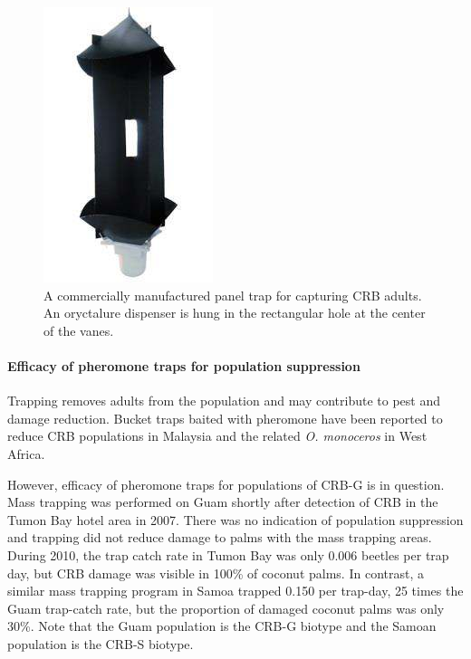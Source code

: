 \documentclass[twocolumn,letterpaper]{scrartcl}
\begin{document}
\begin{figure}[h]
	\centering
	\includegraphics[width=0.7\linewidth]{images/panel-trap}
	\caption{A commercially manufactured panel trap for capturing CRB adults. An oryctalure dispenser is hung in the rectangular hole at the center of the vanes.}
	\label{fig:panel-trap}
\end{figure}

\paragraph{Efficacy of pheromone traps for population suppression} Trapping removes adults from the population and may contribute to pest and damage reduction. Bucket traps baited with pheromone have been reported to reduce CRB populations in Malaysia and the related \textit{O. monoceros} in West Africa. 

However, efficacy of pheromone traps for populations of CRB-G is in question.
Mass trapping was performed on Guam shortly after detection of CRB in the Tumon Bay hotel area in 2007. There was no indication of population suppression and trapping did not reduce damage to palms with the mass trapping areas. During 2010, the trap catch rate in Tumon Bay was only 0.006 beetles per trap day, but CRB damage was visible in 100\% of coconut palms. In contrast, a similar mass trapping program in Samoa trapped 0.150 per trap-day, 25 times the Guam trap-catch rate, but the proportion of damaged coconut palms was only 30\%. Note that the Guam population is the CRB-G biotype and the Samoan population is the CRB-S biotype. 
\end{document}
